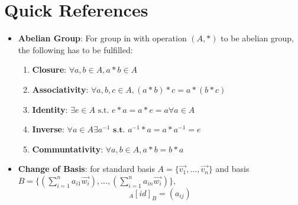 \documentclass[12pt]{article}
\theoremstyle{definition}
\newtheorem{theorem}{THEOREM}[subsection]
\newcommand{\diag}{\text{diag}}
\begin{document}


\newpage
\section*{Quick References}
\begin{itemize}
    \item \textbf{Abelian Group}: For group in with operation $(A,*)$ to be abelian group, the following has to be fulfilled:
        \begin{enumerate}
            \item \textbf{Closure}: $\forall a,b \in A, a*b \in A$
            \item \textbf{Associativity}: $\forall a,b,c \in A, (a*b)*c = a*(b*c)$
            \item \textbf{Identity}: $\exists e \in A \text{ s.t. } e*a = a*e = a \forall a \in A$
            \item \textbf{Inverse}: $\forall a \in A \exists a^{-1} \textbf{ s.t. } a^{-1}*a = a*a^{-1} = e$
            \item \textbf{Communtativity}: $\forall a, b \in A, a*b = b*a$
        \end{enumerate}
    \item \textbf{Change of Basis}: for standard basis $A = \{\vec{v_1},...,\vec{v_n}\}$ and basis $B = \{(\sum_{i=1}^n{a_{i1}}\vec{w_i}),...,(\sum_{i=1}^n{a_{in}}\vec{w_i})\}$, $$_A[id]_B = (a_{ij})$$
\end{itemize}
\end{document}

